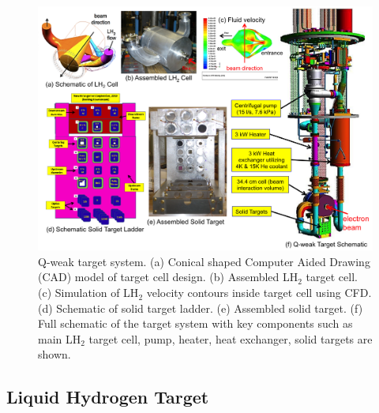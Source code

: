 \begin{singlespace}
\begin{figure}[!h]
	\begin{center}
	\includegraphics[width=15cm]{figures/target}
	\caption
	{Q-weak target system. (a) Conical shaped Computer Aided Drawing (CAD) model of target cell design. (b) Assembled LH$_{2}$ target cell. (c) Simulation of LH$_{2}$ velocity contours inside target cell using CFD. (d) Schematic of solid target ladder. (e) Assembled solid target. (f) Full schematic of the target system with key components such as main LH$_{2}$ target cell, pump, heater, heat exchanger, solid targets are shown. }
	\label{fig:target}
	\end{center}
\end{figure}
\end{singlespace}
%


\subsection{Liquid Hydrogen Target}%
\label{Liquid Hydrogen Target}


